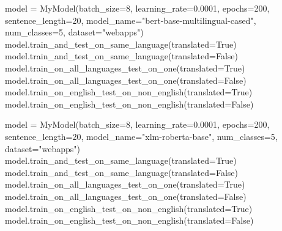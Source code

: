 \begin{python}
    model = MyModel(batch_size=8, learning_rate=0.0001, epochs=200, sentence_length=20,
                    model_name="bert-base-multilingual-cased", num_classes=5, dataset="webapps")
    model.train_and_test_on_same_language(translated=True)
    model.train_and_test_on_same_language(translated=False)
    model.train_on_all_languages_test_on_one(translated=True)
    model.train_on_all_languages_test_on_one(translated=False)
    model.train_on_english_test_on_non_english(translated=True)
    model.train_on_english_test_on_non_english(translated=False)
    
    model = MyModel(batch_size=8, learning_rate=0.0001, epochs=200, sentence_length=20,
                    model_name="xlm-roberta-base", num_classes=5, dataset="webapps")
    model.train_and_test_on_same_language(translated=True)
    model.train_and_test_on_same_language(translated=False)
    model.train_on_all_languages_test_on_one(translated=True)
    model.train_on_all_languages_test_on_one(translated=False)
    model.train_on_english_test_on_non_english(translated=True)
    model.train_on_english_test_on_non_english(translated=False)
\end{python}